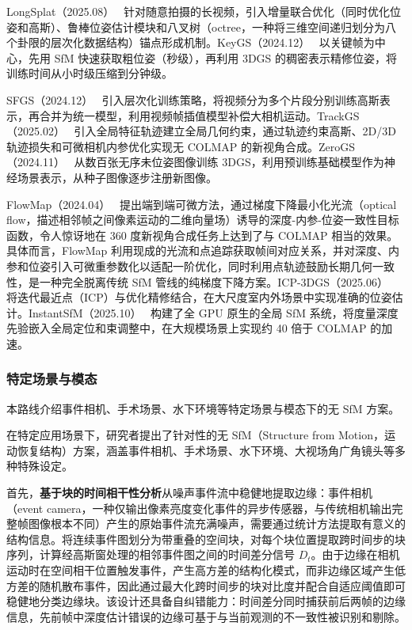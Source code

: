 LongSplat（2025.08）~\cite{2508_14041} 针对随意拍摄的长视频，引入增量联合优化（同时优化位姿和高斯）、鲁棒位姿估计模块和八叉树（octree，一种将三维空间递归划分为八个卦限的层次化数据结构）锚点形成机制。KeyGS（2024.12）~\cite{2412_20767} 以关键帧为中心，先用 SfM 快速获取粗位姿（秒级），再利用 3DGS 的稠密表示精修位姿，将训练时间从小时级压缩到分钟级。

SFGS（2024.12）~\cite{2412_01553} 引入层次化训练策略，将视频分为多个片段分别训练高斯表示，再合并为统一模型，利用视频帧插值模型补偿大相机运动。TrackGS（2025.02）~\cite{2502_19800} 引入全局特征轨迹建立全局几何约束，通过轨迹约束高斯、2D/3D 轨迹损失和可微相机内参优化实现无 COLMAP 的新视角合成。ZeroGS（2024.11）~\cite{2411_15779} 从数百张无序未位姿图像训练 3DGS，利用预训练基础模型作为神经场景表示，从种子图像逐步注册新图像。

FlowMap（2024.04）~\cite{2404_15259} 提出端到端可微方法，通过梯度下降最小化光流（optical flow，描述相邻帧之间像素运动的二维向量场）诱导的深度-内参-位姿一致性目标函数，令人惊讶地在 360 度新视角合成任务上达到了与 COLMAP 相当的效果。具体而言，FlowMap 利用现成的光流和点追踪获取帧间对应关系，并对深度、内参和位姿引入可微重参数化以适配一阶优化，同时利用点轨迹鼓励长期几何一致性，是一种完全脱离传统 SfM 管线的纯梯度下降方案。ICP-3DGS（2025.06）~\cite{2506_21629} 将迭代最近点（ICP）与优化精修结合，在大尺度室内外场景中实现准确的位姿估计。InstantSfM（2025.10）~\cite{2510_13310} 构建了全 GPU 原生的全局 SfM 系统，将度量深度先验嵌入全局定位和束调整中，在大规模场景上实现约 40 倍于 COLMAP 的加速。

\subsubsection{特定场景与模态}

本路线介绍事件相机、手术场景、水下环境等特定场景与模态下的无 SfM 方案。

在特定应用场景下，研究者提出了针对性的无 SfM（Structure from Motion，运动恢复结构）方案，涵盖事件相机、手术场景、水下环境、大视场角广角镜头等多种特殊设定。

首先，\textbf{基于块的时间相干性分析}从噪声事件流中稳健地提取边缘：事件相机（event camera，一种仅输出像素亮度变化事件的异步传感器，与传统相机输出完整帧图像根本不同）产生的原始事件流充满噪声，需要通过统计方法提取有意义的结构信息。将连续事件图划分为带重叠的空间块，对每个块位置提取跨时间步的块序列，计算经高斯窗处理的相邻事件图之间的时间差分信号 $D_t$。由于边缘在相机运动时在空间相干位置触发事件，产生高方差的结构化模式，而非边缘区域产生低方差的随机散布事件，因此通过最大化跨时间步的块对比度并配合自适应阈值即可稳健地分类边缘块。该设计还具备自纠错能力：时间差分同时捕获前后两帧的边缘信息，先前帧中深度估计错误的边缘可基于与当前观测的不一致性被识别和剔除。

